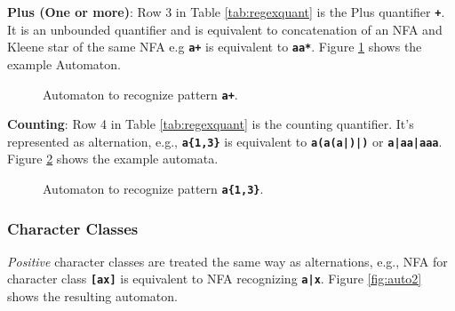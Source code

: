 \noindent
\textbf{Plus (One or more)}: Row 3 in Table \ref{tab:regexquant} is the Plus quantifier \texttt{\textbf{+}}. It is an unbounded quantifier and is equivalent to concatenation of an NFA and Kleene star of the same NFA e.g \texttt{\textbf{a+}} is equivalent to \texttt{\textbf{aa*}}. Figure \ref{fig:autoq2} shows the example Automaton.

\begin{figure}[htpb]
\centering
{}
\caption{Automaton to recognize pattern \texttt{\textbf{a+}}.}
\label{fig:autoq2}
\end{figure}

\newpage
\textbf{Counting}: Row 4 in Table \ref{tab:regexquant} is the counting quantifier. It's represented as alternation, e.g., \texttt{\textbf{a\{1,3\}}} is equivalent to \texttt{\textbf{a(a(a|\epsilon)|\epsilon)}} or \texttt{\textbf{a|aa|aaa}}. Figure \ref{fig:autoq4} shows the example automata.

\begin{figure}[H]
\centering
{}
\caption{Automaton to recognize pattern \texttt{\textbf{a\{1,3\}}}.}
\label{fig:autoq4}
\end{figure}
\subsubsection{Character Classes}
\textit{Positive} character classes are treated the same way as alternations, e.g., NFA for character class \texttt{\textbf{[ax]}} is equivalent to NFA recognizing \texttt{\textbf{a|x}}. Figure \ref{fig:auto2} shows the resulting automaton.


